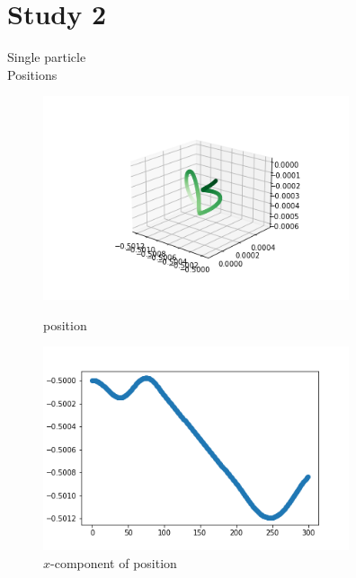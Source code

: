 \documentclass[12pt]{article}
\begin{document}
	
	\section{Study 2}
	
	Single particle \\
	Positions 
	\begin{figure}[H]
		\begin{multicols}{2}
			\includegraphics[width=\linewidth, height=6cm]{ps2.png} \caption{position} \label{ps2} \par
			\includegraphics[width=\linewidth, height=6cm]{psx2.png} \caption{$x$-component of position} \label{psx2} \par
		\end{multicols}
	\end{figure}
\end{document}
